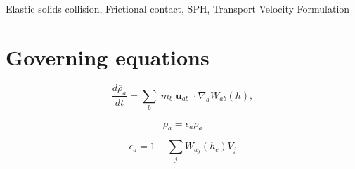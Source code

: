 \documentclass[preprint,12pt]{elsarticle}
\newcommand{\ten}[1]{\ensuremath{\mathbf{#1}}}
\begin{document}
\begin{frontmatter}

  \title{}
  \author[IITB]{Dinesh Adepu}
  \author[University of Surrey]{Chuan Yu Wu}
\address[UoS]{Department of Aerospace Engineering, Indian Institute of
  Technology Bombay, Powai, Mumbai 400076}



\begin{abstract}

\end{abstract}

\begin{keyword}
{Elastic solids collision}, {Frictional contact}, {SPH}, {Transport Velocity Formulation}


\end{keyword}

\end{frontmatter}


\section{Governing equations}
\label{sec:intro}

\begin{equation}
  \label{eq:sph-discretization-continuity}
  \frac{d\overline{\rho}_a}{dt} = \sum_{b} \;
   m_b \; {\ten{u}}_{ab} \; \cdot \nabla_{a} W_{ab}(h),
\end{equation}


\begin{equation}
  \label{eq:sph-discretization-continuity}
  \overline{\rho}_a=\epsilon_a \rho_a
\end{equation}

\begin{equation}
  \label{eq:fluid-porosity}
  \epsilon_a = 1 - \sum_j W_{aj}(h_c) V_j
\end{equation}
\end{document}
